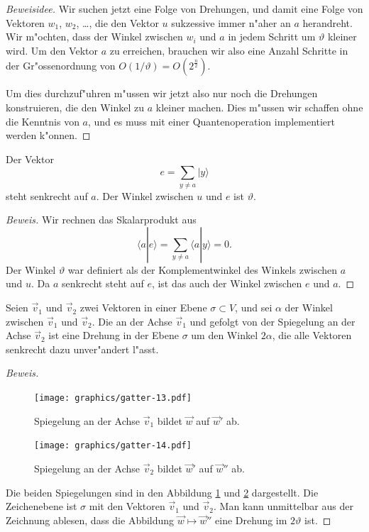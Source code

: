 \begin{proof}[Beweisidee]
Wir suchen jetzt eine Folge von Drehungen, und damit
eine Folge von Vektoren $w_1$, $w_2$, \dots, die den Vektor $u$ sukzessive
immer n"aher an $a$ herandreht.
Wir m"ochten, dass der Winkel zwischen $w_i$ und $a$ in jedem Schritt 
um $\vartheta$ kleiner wird.
Um den Vektor $a$ zu erreichen, brauchen wir also eine Anzahl Schritte
in der Gr"ossenordnung von $O(1/\vartheta)=O(2^{\frac{n}2})$.

Um dies durchzuf"uhren m"ussen wir jetzt also nur noch die Drehungen
konstruieren, die den Winkel zu $a$ kleiner machen.
Dies m"ussen wir schaffen ohne die Kenntnis von $a$, und es muss mit
einer Quantenoperation implementiert werden k"onnen.
\end{proof}

\begin{hilfssatz}
Der Vektor
\[
e=\sum_{y\ne a}|y\rangle
\]
steht senkrecht auf $a$.
Der Winkel zwischen $u$ und $e$ ist $\vartheta$.
\label{skript:hilfssatz-winkel}
\end{hilfssatz}

\begin{proof}[Beweis]
Wir rechnen das Skalarprodukt aus
\[
\langle a|e\rangle
=
\sum_{y\ne a}\langle a|y\rangle =0.
\]
Der Winkel $\vartheta$ war definiert als der Komplementwinkel
des Winkels zwischen $a$ und $u$.
Da $a$ senkrecht steht auf $e$, ist das auch der Winkel zwischen
$e$ und $a$.
\end{proof}

\begin{hilfssatz}
Seien $\vec v_1$ und $\vec v_2$ zwei Vektoren in einer Ebene
$\sigma\subset V$, und sei $\alpha$ der Winkel zwischen $\vec v_1$
und $\vec v_2$.
Die an der Achse $\vec v_1$ und gefolgt von der Spiegelung an der Achse
$\vec v_2$ ist eine Drehung in der Ebene $\sigma$ um den Winkel $2\alpha$,
die alle Vektoren senkrecht dazu unver"andert l"asst.
\label{skript:hilfssatz-drehung}
\end{hilfssatz}

\begin{proof}[Beweis]
\begin{figure}
\centering
\texttt{[image: graphics/gatter-13.pdf]}
\caption{Spiegelung an der Achse $\vec v_1$ bildet $\vec w$ auf $\vec w'$ ab.
\label{skript:drehung-spiegelung-1}}
\end{figure}
\begin{figure}
\centering
\texttt{[image: graphics/gatter-14.pdf]}
\caption{Spiegelung an der Achse $\vec v_2$ bildet $\vec w'$ auf $\vec w''$ ab.
\label{skript:drehung-spiegelung-2}}
\end{figure}
Die beiden Spiegelungen sind in den Abbildung
\ref{skript:drehung-spiegelung-1}
und
\ref{skript:drehung-spiegelung-2}
dargestellt.
Die Zeichenebene ist $\sigma$ mit den Vektoren $\vec v_1$ und $\vec v_2$.
Man kann unmittelbar aus der Zeichnung ablesen, dass
die Abbildung $\vec w\mapsto \vec w''$ eine Drehung im $2\vartheta$ ist.
\end{proof}

